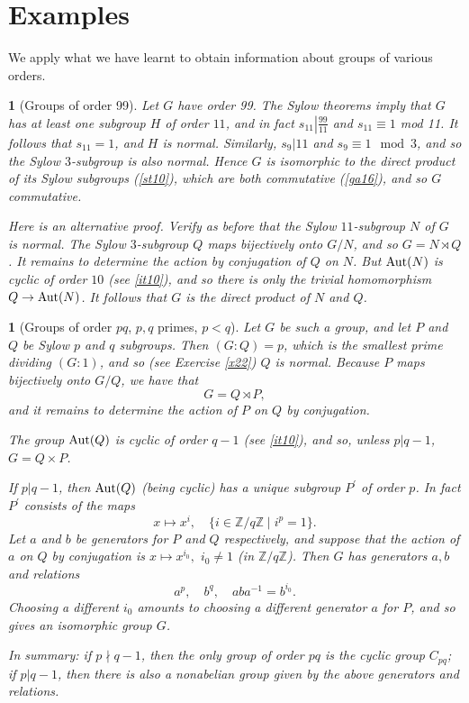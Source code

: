 \documentclass[a4paper,11pt,final,openany]{memoir}%
\newtheorem{plain}[X]{}
\theoremstyle{nonumberplain}
\begin{document}
\section{Examples}

We apply what we have learnt to obtain information about groups of various orders.

\begin{plain}
[Groups of order 99]\label{st12}%
%
Let $G$ have order 99. The Sylow theorems imply that $G$ has at least one
subgroup $H$ of order $11$, and in fact $s_{11}\left\vert \frac{99}%
{11}\right.  $ and $s_{11}\equiv1$ mod 11. It follows that $s_{11}=1$, and $H$
is normal. Similarly, $s_{9}|11$ and $s_{9}\equiv1\mod3$, and so the Sylow
$3$-subgroup is also normal. Hence $G$ is isomorphic to the direct product of
its Sylow subgroups (\ref{st10}), which are both commutative (\ref{ga16}), and
so $G$ commutative.

Here is an alternative proof. Verify as before that the Sylow $11$-subgroup
$N$ of $G$ is normal. The Sylow $3$-subgroup $Q$ maps bijectively onto $G/N$,
and so $G=N\rtimes Q$. It remains to determine the action by conjugation of
$Q$ on $N$. But $\operatorname{Aut}(N)$ is cyclic of order $10$ (see \ref{it10}), and so
there is only the trivial homomorphism $Q\rightarrow\operatorname{Aut}(N)$. It follows that
$G$ is the direct product of $N$ and $Q$.
\end{plain}

\begin{plain}
[Groups of order $pq$, $p,q$ primes, $p<q$]\label{st13}%
%
Let $G$ be such a group, and let $P$ and $Q$ be Sylow $p$ and $q$ subgroups.
Then $(G:Q)=p$, which is the smallest prime dividing $(G:1)$, and so (see
Exercise \ref{x22}) $Q$ is normal. Because $P$ maps bijectively onto $G/Q$, we
have that
\[
G=Q\rtimes P,
\]
and it remains to determine the action of $P$ on $Q$ by conjugation.

The group $\operatorname{Aut}(Q)$ is cyclic of order $q-1$ (see \ref{it10}), and so, unless
$p|q-1$, $G=Q\times P$.

If $p|q-1$, then $\operatorname{Aut}(Q)$ (being cyclic) has a unique subgroup $P^{\prime}$
of order $p$. In fact $P^{\prime}$ consists of the maps
\[
x\mapsto x^{i},\quad\{i\in\mathbb{\mathbb{Z}{}}/q\mathbb{Z}{}\mid i^{p}=1\}.
\]
Let $a$ and $b$ be generators for $P$ and $Q$ respectively, and suppose that
the action of $a$ on $Q$ by conjugation is $x\mapsto x^{i_{0}},$ $i_{0}\neq1$
(in $\mathbb{\mathbb{Z}{}}/q\mathbb{Z}$). Then $G$ has generators $a,b$ and
relations
\[
a^{p},\quad b^{q},\quad aba^{-1}=b^{i_{0}}.
\]
Choosing a different $i_{0}$ amounts to choosing a different generator $a$ for
$P$, and so gives an isomorphic group $G$.

In summary: if $p\nmid q-1$, then the only group of order $pq$ is the cyclic
group $C_{pq}$; if $p|q-1$, then there is also a nonabelian group given by the
above generators and relations.
\end{plain}
\end{document}
